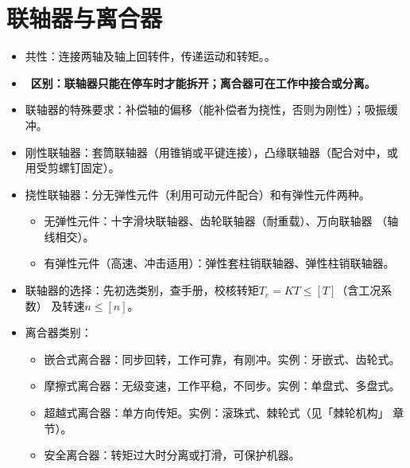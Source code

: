 \documentclass[12pt,a4paper]{article}
\newcommand{\tightlist}{\setlength{\parskip}{0pt}\setlength{\itemsep}{0pt}}
\newcommand{\hint}[1]{\textsf{（#1）}}
\newcommand{\minor}[1]{{\color{gray} #1}}
\renewcommand{\emph}[1]{\faIcon[regular]{lightbulb}\ \textbf{#1}}
\begin{document}
\section{联轴器与离合器}
\begin{itemize}\tightlist
    \item 共性：连接两轴及轴上回转件，传递运动和转矩。。
    \item \emph{区别：联轴器只能在停车时才能拆开；离合器可在工作中接合或分离。}
    \item 联轴器的特殊要求：补偿轴的偏移\hint{能补偿者为挠性，否则为刚性}；吸振缓冲。
    \item 刚性联轴器：套筒联轴器\hint{用锥销或平键连接}，凸缘联轴器\hint{配合对中，或
    用受剪螺钉固定}。
    \item 挠性联轴器：分无弹性元件\hint{利用可动元件配合}和有弹性元件两种。
    \begin{itemize}\tightlist
        \item 无弹性元件：十字滑块联轴器、齿轮联轴器\hint{耐重载}、万向联轴器
        \hint{轴线相交}。
        \item 有弹性元件\hint{高速、冲击适用}：弹性套柱销联轴器、弹性柱销联轴器。
    \end{itemize}
    \item 联轴器的选择：先初选类别，查手册，校核转矩$T_c=KT\leq[T]$\hint{含工况系数}
    及转速$n\leq[n]$。
    \item 离合器类别：
    \begin{itemize}\tightlist
        \item 嵌合式离合器：同步回转，工作可靠，有刚冲。实例：牙嵌式、齿轮式。
        \item 摩擦式离合器：无级变速，工作平稳，不同步。实例：单盘式、多盘式。
        \item \minor{超越式离合器：单方向传矩。实例：滚珠式、棘轮式\hint{见「棘轮机构」
        章节}。}
        \item \minor{安全离合器：转矩过大时分离或打滑，可保护机器。}
    \end{itemize}
\end{itemize}
\end{document}
